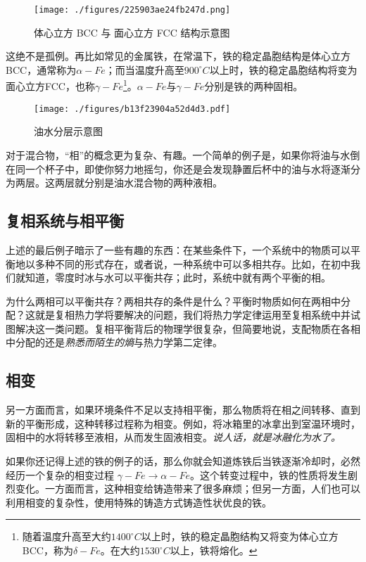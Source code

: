 \begin{figure}[ht]
\centering
\texttt{[image: ./figures/225903ae24fb247d.png]}
\caption{体心立方 BCC 与 面心立方 FCC 结构示意图} \label{fig_PHS_4}
\end{figure}
这绝不是孤例。再比如常见的金属铁，在常温下，铁的稳定晶胞结构是体心立方BCC，通常称为$\alpha-Fe$；而当温度升高至$900 ^\circ C$以上时，铁的稳定晶胞结构将变为面心立方FCC，也称$\gamma-Fe$\footnote{随着温度升高至大约$1400 ^\circ C$以上时，铁的稳定晶胞结构又将变为体心立方BCC，称为$\delta - Fe$。在大约$1530 ^\circ C$以上，铁将熔化。}。$\alpha-Fe$与$\gamma-Fe$分别是铁的两种固相。

\begin{figure}[ht]
\centering
\texttt{[image: ./figures/b13f23904a52d4d3.pdf]}
\caption{油水分层示意图} \label{fig_PHS_5}
\end{figure}
对于混合物，“相”的概念更为复杂、有趣。一个简单的例子是，如果你将油与水倒在同一个杯子中，即使你努力地摇匀，你还是会发现静置后杯中的油与水将逐渐分为两层。这两层就分别是油水混合物的两种液相。


\subsection{复相系统与相平衡}
上述的最后例子暗示了一些有趣的东西：在某些条件下，一个系统中的物质可以平衡地以多种不同的形式存在，或者说，一种系统中可以多相共存。比如，在初中我们就知道，零度时冰与水可以平衡共存；此时，系统中就有两个平衡的相。


为什么两相可以平衡共存？两相共存的条件是什么？平衡时物质如何在两相中分配？这就是复相热力学将要解决的问题，我们将热力学定律运用至复相系统中并试图解决这一类问题。复相平衡背后的物理学很复杂，但简要地说，支配物质在各相中分配的还是\textsl{熟悉而陌生的熵}与热力学第二定律。

\subsection{相变}
另一方面而言，如果环境条件不足以支持相平衡，那么物质将在相之间转移、直到新的平衡形成，这种转移过程称为相变。例如，将冰箱里的冰拿出到室温环境时，固相中的水将转移至液相，从而发生固液相变。\textsl{说人话，就是冰融化为水了。}

如果你还记得上述的铁的例子的话，那么你就会知道炼铁后当铁逐渐冷却时，必然经历一个复杂的相变过程 $\gamma - Fe \rightarrow \alpha - Fe$。这个转变过程中，铁的性质将发生剧烈变化。一方面而言，这种相变给铸造带来了很多麻烦；但另一方面，人们也可以利用相变的复杂性，使用特殊的铸造方式铸造性状优良的铁。
